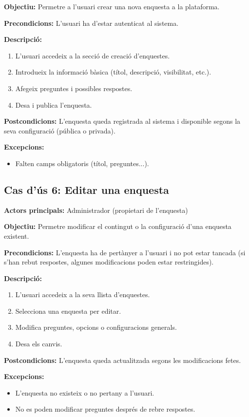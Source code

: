 \documentclass[../main.tex]{subfiles}
\begin{document}
\textbf{Objectiu:} Permetre a l’usuari crear una nova enquesta a la plataforma.

\textbf{Precondicions:}  
L’usuari ha d’estar autenticat al sistema.

\textbf{Descripció:}
\begin{enumerate}
    \item L’usuari accedeix a la secció de creació d’enquestes.
    \item Introdueix la informació bàsica (títol, descripció, visibilitat, etc.).
    \item Afegeix preguntes i possibles respostes.
    \item Desa i publica l’enquesta.
\end{enumerate}

\textbf{Postcondicions:}  
L’enquesta queda registrada al sistema i disponible segons la seva configuració (pública o privada).

\textbf{Excepcions:}
\begin{itemize}
    \item Falten camps obligatoris (títol, preguntes...).
\end{itemize}

\subsection*{Cas d’ús 6: Editar una enquesta}

\textbf{Actors principals:} Administrador (propietari de l’enquesta)

\textbf{Objectiu:} Permetre modificar el contingut o la configuració d’una enquesta existent.

\textbf{Precondicions:}  
L’enquesta ha de pertànyer a l’usuari i no pot estar tancada (si s’han rebut respostes, algunes modificacions poden estar restringides).

\textbf{Descripció:}
\begin{enumerate}
    \item L’usuari accedeix a la seva llista d’enquestes.
    \item Selecciona una enquesta per editar.
    \item Modifica preguntes, opcions o configuracions generals.
    \item Desa els canvis.
\end{enumerate}

\textbf{Postcondicions:}  
L’enquesta queda actualitzada segons les modificacions fetes.

\textbf{Excepcions:}
\begin{itemize}
    \item L’enquesta no existeix o no pertany a l’usuari.
    \item No es poden modificar preguntes després de rebre respostes.
\end{itemize}
\end{document}

